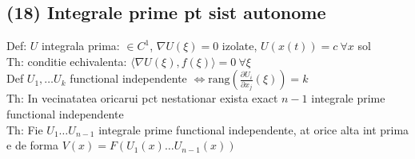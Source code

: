 \documentclass{article}
\newcommand{\parti}[2]{\frac{\partial #1}{ \partial #2}}
\begin{document}
\subsection*{(18) Integrale prime pt sist autonome}
Def: $U $ integrala prima: $\in C^1$, $\nabla U(\xi) = 0$ izolate, $U(x(t)) = c\  \forall x$ sol \\
Th: conditie echivalenta: $\langle \nabla U(\xi), f(\xi) \rangle= 0\ \forall \xi$\\
Def $U_1, \ldots U_k$ functional independente $\displaystyle \iff \mathrm{rang} \left( \parti{U_i}{x_j}(\xi) \right) = k $ \\
Th: In vecinatatea oricarui pct nestationar exista exact $n-1$ integrale prime functional independente\\
Th: Fie $U_1\ldots U_{n-1}$ integrale prime functional independente, at orice alta int prima e de forma $V(x) = F(U_1(x) \ldots U_{n-1}(x))$
\end{document}
